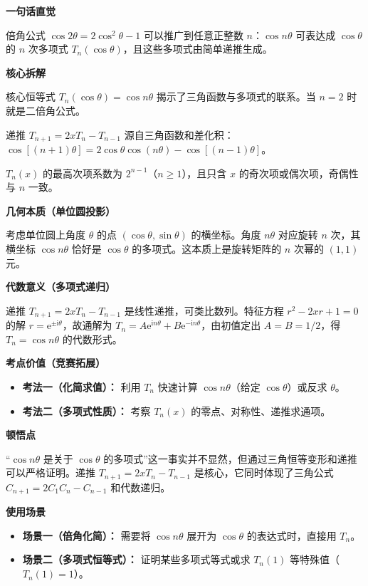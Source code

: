 \begin{explanationbox}
	\textbf{\textcolor{CExplanation}{一句话直觉}}

	倍角公式 $\cos 2\theta = 2\cos^2\theta-1$ 可以推广到任意正整数 $n$：$\cos n\theta$ 可表达成 $\cos\theta$ 的 $n$ 次多项式 $T_n(\cos\theta)$，且这些多项式由简单递推生成。

	\medskip
	\textbf{\textcolor{CExplanation}{核心拆解}}
	\begin{description}[style=nextline, leftmargin=2.8em, labelsep=0.5em, itemsep=0.45em]
		\item[\textbf{要点一（三角恒等式）：}] 核心恒等式 $T_n(\cos\theta)=\cos n\theta$ 揭示了三角函数与多项式的联系。当 $n=2$ 时就是二倍角公式。
		\item[\textbf{要点二（递推关系）：}] 递推 $T_{n+1}=2xT_n-T_{n-1}$ 源自三角函数和差化积：$\cos[(n+1)\theta] = 2\cos\theta\cos(n\theta) - \cos[(n-1)\theta]$。
		\item[\textbf{要点三（多项式系数）：}] $T_n(x)$ 的最高次项系数为 $2^{n-1}$（$n\ge1$），且只含 $x$ 的奇次项或偶次项，奇偶性与 $n$ 一致。
	\end{description}

	\medskip
	\textbf{\textcolor{CExplanation}{几何本质（单位圆投影）}}

	考虑单位圆上角度 $\theta$ 的点 $(\cos\theta,\sin\theta)$ 的横坐标。角度 $n\theta$ 对应旋转 $n$ 次，其横坐标 $\cos n\theta$ 恰好是 $\cos\theta$ 的多项式。这本质上是旋转矩阵的 $n$ 次幂的 $(1,1)$ 元。

	\medskip
	\textbf{\textcolor{CExplanation}{代数意义（多项式递归）}}

	递推 $T_{n+1}=2xT_n-T_{n-1}$ 是线性递推，可类比数列。特征方程 $r^2-2xr+1=0$ 的解 $r=\mathrm{e}^{\pm\mathrm{i}\theta}$，故通解为 $T_n=A\mathrm{e}^{\mathrm{i}n\theta}+B\mathrm{e}^{-\mathrm{i}n\theta}$，由初值定出 $A=B=1/2$，得 $T_n=\cos n\theta$ 的代数形式。

	\medskip
	\textbf{\textcolor{CExplanation}{考点价值（竞赛拓展）}}
	\begin{itemize}[leftmargin=*, itemsep=0.5em, topsep=0.4em]
		\item \textbf{考法一（化简求值）：} 利用 $T_n$ 快速计算 $\cos n\theta$（给定 $\cos\theta$）或反求 $\theta$。
		\item \textbf{考法二（多项式性质）：} 考察 $T_n(x)$ 的零点、对称性、递推求通项。
	\end{itemize}

	\medskip
	\textbf{\textcolor{CExplanation}{顿悟点}}

	“$\cos n\theta$ 是关于 $\cos\theta$ 的多项式”这一事实并不显然，但通过三角恒等变形和递推可以严格证明。递推 $T_{n+1}=2xT_n-T_{n-1}$ 是核心，它同时体现了三角公式 $C_{n+1}=2C_1C_n-C_{n-1}$ 和代数递归。

	\medskip
	\textbf{\textcolor{CExplanation}{使用场景}}
	\begin{itemize}[leftmargin=*, itemsep=0.5em, topsep=0.4em]
		\item \textbf{场景一（倍角化简）：} 需要将 $\cos n\theta$ 展开为 $\cos\theta$ 的表达式时，直接用 $T_n$。
		\item \textbf{场景二（多项式恒等式）：} 证明某些多项式等式或求 $T_n(1)$ 等特殊值（$T_n(1)=1$）。
	\end{itemize}
\end{explanationbox}
